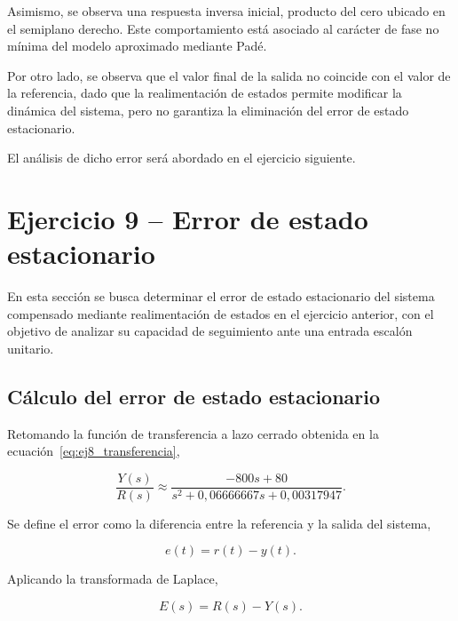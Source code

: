 \documentclass[10pt]{article}
\begin{document}
Asimismo, se observa una respuesta inversa inicial,
producto del cero ubicado en el semiplano derecho.
Este comportamiento está asociado al carácter de
fase no mínima del modelo aproximado mediante Padé.

Por otro lado, se observa que el valor final de la salida
no coincide con el valor de la referencia, dado que la
realimentación de estados permite modificar la dinámica
del sistema, pero no garantiza la eliminación del error
de estado estacionario.

El análisis de dicho error será abordado en el ejercicio
siguiente.




\clearpage
\setcounter{section}{9}
\setcounter{subsection}{0}
\section*{Ejercicio 9 -- Error de estado estacionario}

En esta sección se busca determinar el error de estado
estacionario del sistema compensado mediante realimentación
de estados en el ejercicio anterior, con el objetivo de
analizar su capacidad de seguimiento ante una entrada
escalón unitario.


\subsection{Cálculo del error de estado estacionario}

Retomando la función de transferencia a lazo cerrado
obtenida en la ecuación~\eqref{eq:ej8_transferencia},

\begin{equation}
    \frac{Y(s)}{R(s)}\approx
    \frac{-800s+80}
    {s^2+0{,}06666667s+0{,}00317947}.
\end{equation}

Se define el error como la diferencia entre la
referencia y la salida del sistema,

\begin{equation}
    e(t)=r(t)-y(t).
\end{equation}

Aplicando la transformada de Laplace,

\begin{equation}
    E(s)=R(s)-Y(s).
\end{equation}
\end{document}
